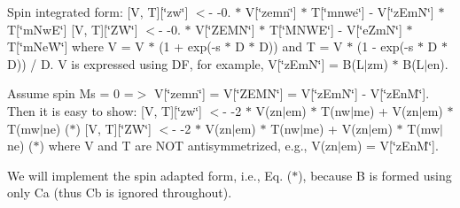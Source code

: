 Spin integrated form\+: \mbox{[}V, T\mbox{]}\mbox{[}\char`\"{}zw\char`\"{}\mbox{]} $<$-\/ -\/0. $\ast$ V\textquotesingle{}\mbox{[}\char`\"{}zemn\char`\"{}\mbox{]} $\ast$ T\mbox{[}\char`\"{}mnwe\char`\"{}\mbox{]} -\/ V\textquotesingle{}\mbox{[}\char`\"{}z\+Em\+N\char`\"{}\mbox{]} $\ast$ T\mbox{[}\char`\"{}m\+Nw\+E\char`\"{}\mbox{]} \mbox{[}V, T\mbox{]}\mbox{[}\char`\"{}\+Z\+W\char`\"{}\mbox{]} $<$-\/ -\/0. $\ast$ V\textquotesingle{}\mbox{[}\char`\"{}\+Z\+E\+M\+N\char`\"{}\mbox{]} $\ast$ T\mbox{[}\char`\"{}\+M\+N\+W\+E\char`\"{}\mbox{]} -\/ V\textquotesingle{}\mbox{[}\char`\"{}e\+Zm\+N\char`\"{}\mbox{]} $\ast$ T\mbox{[}\char`\"{}m\+Ne\+W\char`\"{}\mbox{]} where V\textquotesingle{} = V $\ast$ (1 + exp(-\/s $\ast$ D $\ast$ D)) and T = V $\ast$ (1 -\/ exp(-\/s $\ast$ D $\ast$ D)) / D. V is expressed using DF, for example, V\mbox{[}\char`\"{}z\+Em\+N\char`\"{}\mbox{]} = B(L$\vert$zm) $\ast$ B(L$\vert$en).

Assume spin Ms = 0 =$>$ V\mbox{[}\char`\"{}zemn\char`\"{}\mbox{]} = V\mbox{[}\char`\"{}\+Z\+E\+M\+N\char`\"{}\mbox{]} = V\mbox{[}\char`\"{}z\+Em\+N\char`\"{}\mbox{]} -\/ V\mbox{[}\char`\"{}z\+En\+M\char`\"{}\mbox{]}. Then it is easy to show\+: \mbox{[}V, T\mbox{]}\mbox{[}\char`\"{}zw\char`\"{}\mbox{]} $<$-\/ -\/2 $\ast$ V\textquotesingle{}\textquotesingle{}(zn$\vert$em) $\ast$ T\textquotesingle{}\textquotesingle{}(nw$\vert$me) + V\textquotesingle{}\textquotesingle{}(zn$\vert$em) $\ast$ T\textquotesingle{}\textquotesingle{}(mw$\vert$ne) ($\ast$) \mbox{[}V, T\mbox{]}\mbox{[}\char`\"{}\+Z\+W\char`\"{}\mbox{]} $<$-\/ -\/2 $\ast$ V\textquotesingle{}\textquotesingle{}(zn$\vert$em) $\ast$ T\textquotesingle{}\textquotesingle{}(nw$\vert$me) + V\textquotesingle{}\textquotesingle{}(zn$\vert$em) $\ast$ T\textquotesingle{}\textquotesingle{}(mw$\vert$ne) ($\ast$) where V\textquotesingle{}\textquotesingle{} and T\textquotesingle{}\textquotesingle{} are N\+OT antisymmetrized, e.\+g., V\textquotesingle{}\textquotesingle{}(zn$\vert$em) = V\textquotesingle{}\mbox{[}\char`\"{}z\+En\+M\char`\"{}\mbox{]}.

We will implement the spin adapted form, i.\+e., Eq. ($\ast$), because B is formed using only Ca (thus Cb is ignored throughout).


